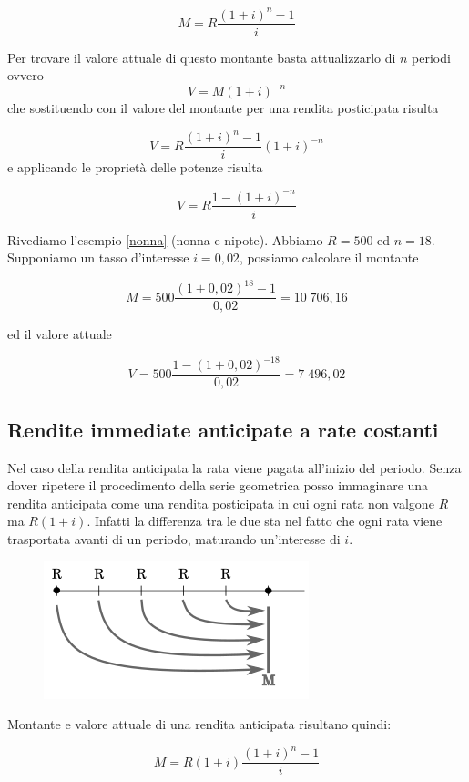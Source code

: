 \begin{definizione} $$ M=R\dfrac{(1+i)^n-1}{i} 
$$ \end{definizione}

Per trovare il valore attuale di questo montante basta attualizzarlo di $n$ 
periodi ovvero $$V=M(1+i)^{-n}$$ che sostituendo con il valore del montante per 
una rendita posticipata risulta

 $$V=R\dfrac{(1+i)^n-1}{i}(1+i)^{-n}$$ e applicando le proprietà delle potenze 
risulta


\begin{definizione} $$ 
V=R\dfrac{1-(1+i)^{-n}}{i} $$ \end{definizione}

\begin{exrig} \begin{esempio} Rivediamo l'esempio \ref{nonna} (nonna e nipote). 
Abbiamo $R=500$ ed $n=18$. Supponiamo un tasso d'interesse $i=0,02$, possiamo 
calcolare il montante

$$ M=500\dfrac{(1+0,02)^{18}-1}{0,02}=10\;706,16 $$

ed il valore attuale

$$ V=500\dfrac{1-(1+0,02)^{-18}}{0,02}=7\;496,02 $$ \end{esempio} \end{exrig}

\subsection{Rendite immediate anticipate a rate costanti} Nel caso della rendita 
anticipata la rata viene pagata all'inizio del periodo. Senza dover ripetere il 
procedimento della serie geometrica posso immaginare una rendita anticipata come 
una rendita posticipata in cui ogni rata non valgone $R$ ma $R(1+i)$. Infatti la 
differenza tra le due sta nel fatto che ogni rata viene trasportata avanti di un 
periodo, maturando un'interesse di $i$. \begin{figure}[htp] \centering 
\includegraphics[scale=1]{img/anticipata.png}

\end{figure} Montante e valore attuale di una rendita anticipata risultano 
quindi: \begin{definizione} $$ 
M=R(1+i)\dfrac{(1+i)^n-1}{i} $$ \end{definizione}



